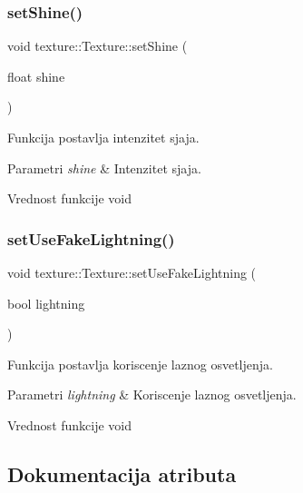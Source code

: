 \subsubsection{\texorpdfstring{set\+Shine()}{setShine()}}
{\footnotesize\ttfamily void texture\+::\+Texture\+::set\+Shine (\begin{DoxyParamCaption}\item[{float}]{shine }\end{DoxyParamCaption})}



Funkcija postavlja intenzitet sjaja. 


\begin{DoxyParams}{Parametri}
{\em shine} & Intenzitet sjaja. \\
\hline
\end{DoxyParams}
\begin{DoxyReturn}{Vrednost funkcije}
void 
\end{DoxyReturn}
\mbox{\label{classtexture_1_1Texture_af5e98e7311d5c9aab742d58b6f9918a8}} 
\subsubsection{\texorpdfstring{set\+Use\+Fake\+Lightning()}{setUseFakeLightning()}}
{\footnotesize\ttfamily void texture\+::\+Texture\+::set\+Use\+Fake\+Lightning (\begin{DoxyParamCaption}\item[{bool}]{lightning }\end{DoxyParamCaption})}



Funkcija postavlja koriscenje laznog osvetljenja. 


\begin{DoxyParams}{Parametri}
{\em lightning} & Koriscenje laznog osvetljenja. \\
\hline
\end{DoxyParams}
\begin{DoxyReturn}{Vrednost funkcije}
void 
\end{DoxyReturn}


\subsection{Dokumentacija atributa}
\mbox{\label{classtexture_1_1Texture_ae21644c129b699d28722f86fe098b028}} 
